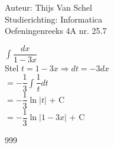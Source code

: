 \documentclass[a4paper]{article}
\begin{document}
  
\noindent \large Auteur: Thijs Van Schel \\
\noindent \large Studierichting: Informatica\\
\noindent \large Oefeningenreeks 4A nr. 25.7\\

\medskip

\normalsize

$\displaystyle\int \dfrac{dx}{1-3x}$\\

Stel $t = 1-3x\Rightarrow dt = -3dx$\\

$= -\dfrac{1}{3} \displaystyle\int \dfrac{1}{t}dt$\\

$= -\dfrac{1}{3} \ln|t|$ + C\\

$= -\dfrac{1}{3} \ln|1-3x|$ + C\\

\begin{thebibliography}{999}
\end{thebibliography}
\end{document}
